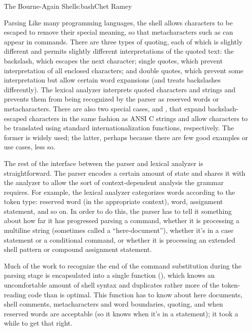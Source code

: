 \begin{aosachapter}{The Bourne-Again Shell}{s:bash}{Chet Ramey}
\begin{aosasect1}{Parsing}
Like many programming languages, the shell allows characters to be
escaped to remove their special meaning, so that metacharacters such as
\code{\&} can appear in commands.  There are three types of quoting,
each of which is slightly different and permits slightly different
interpretations of the quoted text: the backslash, which escapes the
next character; single quotes, which prevent interpretation of all
enclosed characters; and double quotes, which prevent some
interpretation but allow certain word expansions (and treats
backslashes differently).  The lexical analyzer interprets quoted
characters and strings and prevents them from being recognized by the
parser as reserved words or metacharacters.  There are also two
special cases,  and , that expand
backslash-escaped characters in the same fashion as ANSI C strings and
allow characters to be translated using standard internationalization
functions, respectively.  The former is widely used; the latter,
perhaps because there are few good examples or use cases, less so.

The rest of the interface between the parser and lexical analyzer is
straightforward.  The parser encodes a certain amount of state and
shares it with the analyzer to allow the sort of context-dependent
analysis the grammar requires.  For example, the lexical analyzer
categorizes words according to the token type: reserved word (in the
appropriate context), word, assignment statement, and so on.  In order
to do this, the parser has to tell it something about how far it has
progressed parsing a command, whether it is processing a
multiline string (sometimes called a ``here-document''),
whether it's in a case statement or a conditional
command, or whether it is processing an extended shell pattern or compound
assignment statement.

Much of the work to recognize the end of the command substitution
during the parsing stage is encapsulated into a single function
(), which knows an uncomfortable amount of shell
syntax and duplicates rather more of the token-reading code than is
optimal.  This function has to know about here documents, shell
comments, metacharacters and word boundaries, quoting, and when
reserved words are acceptable (so it knows when it's in a 
statement); it took a while to get that right.


\end{aosasect1}
\end{aosachapter}
